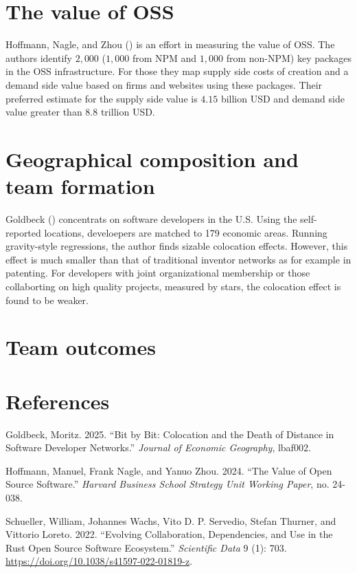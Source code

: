 \documentclass[
  12pt,
]{article}
\newlength{\cslhangindent}
\newenvironment{CSLReferences}[2] %
 {\begin{list}{}{%
  \setlength{\itemindent}{0pt}
  \setlength{\leftmargin}{0pt}
  \setlength{\parsep}{0pt}
  \ifodd #1
   \setlength{\leftmargin}{\cslhangindent}
   \setlength{\itemindent}{-1\cslhangindent}
  \fi
  \setlength{\itemsep}{#2\baselineskip}}}
 {\end{list}}
\begin{document}
\section{The value of OSS}\label{sec-value}

Hoffmann, Nagle, and Zhou () is an
effort in measuring the value of OSS. The authors identify \(2,000\)
(\(1,000\) from NPM and \(1,000\) from non-NPM) key packages in the OSS
infrastructure. For those they map supply side costs of creation and a
demand side value based on firms and websites using these packages.
Their preferred estimate for the supply side value is \(4.15\) billion
USD and demand side value greater than \(8.8\) trillion USD.

\section{Geographical composition and team formation}\label{sec-teams}

Goldbeck () concentrats on software
developers in the U.S. Using the self-reported locations, develoepers
are matched to 179 economic areas. Running gravity-style regressions,
the author finds sizable colocation effects. However, this effect is
much smaller than that of traditional inventor networks as for example
in patenting. For developers with joint organizational membership or
those collaborting on high quality projects, measured by stars, the
colocation effect is found to be weaker.

\section{Team outcomes}\label{sec-outcomes}

\section{References}\label{sec-references}

\label{refs}
\begin{CSLReferences}{1}{0}
Goldbeck, Moritz. 2025. {``Bit by Bit: Colocation and the Death of
Distance in Software Developer Networks.''} \emph{Journal of Economic
Geography}, lbaf002.

Hoffmann, Manuel, Frank Nagle, and Yanuo Zhou. 2024. {``The Value of
Open Source Software.''} \emph{Harvard Business School Strategy Unit
Working Paper}, no. 24-038.

Schueller, William, Johannes Wachs, Vito D. P. Servedio, Stefan Thurner,
and Vittorio Loreto. 2022. {``Evolving Collaboration, Dependencies, and
Use in the Rust Open Source Software Ecosystem.''} \emph{Scientific
Data} 9 (1): 703. \url{https://doi.org/10.1038/s41597-022-01819-z}.

\end{CSLReferences}

\setcounter{section}{0}
\renewcommand{\thesection}{\Alph{section}}

\setcounter{table}{0}
\renewcommand{\thetable}{A\arabic{table}}

\setcounter{figure}{0}
\renewcommand{\thefigure}{A\arabic{figure}}
\end{document}
